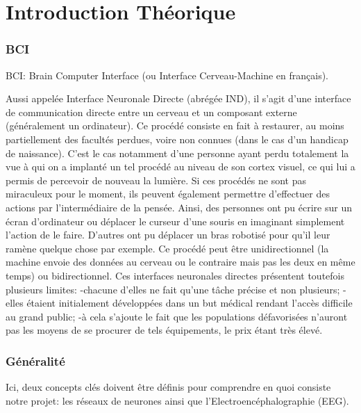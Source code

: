 \part{Introduction Théorique} %
\label{prt:introduction_ _théorique_}
	
	\section{BCI} %
	\label{sec:bci}
	
	BCI: Brain Computer Interface (ou Interface Cerveau-Machine en français).
	
	Aussi appelée Interface Neuronale Directe (abrégée IND), il s'agit d'une interface de communication directe entre un cerveau et un composant externe (généralement un ordinateur).
	Ce procédé consiste en fait à restaurer, au moins partiellement des facultés perdues, voire non connues (dans le cas d'un handicap de naissance). C'est le cas notamment d'une personne ayant perdu totalement la vue à qui on a implanté un tel procédé au niveau de son cortex visuel, ce qui lui a permis de percevoir de nouveau la lumière. Si ces procédés ne sont pas miraculeux pour le moment, ils peuvent également permettre d'effectuer des actions par l'intermédiaire de la pensée. Ainsi, des personnes ont pu écrire sur un écran d'ordinateur ou déplacer le curseur d'une souris en imaginant simplement l'action de le faire. D'autres ont pu déplacer un bras robotisé pour qu'il leur ramène quelque chose par exemple.
	Ce procédé peut être unidirectionnel (la machine envoie des données au cerveau ou le contraire mais pas les deux en même temps) ou bidirectionnel.
	Ces interfaces neuronales directes présentent toutefois plusieurs limites:
-chacune d'elles ne fait qu'une tâche précise et non plusieurs;
-elles étaient initialement développées dans un but médical rendant l'accès difficile au grand public;
-à cela s'ajoute le fait que les populations défavorisées n'auront pas les moyens de se procurer de tels équipements, le prix étant très élevé.
	
	
	

	\section{Généralité} %
	\label{sec:généralité}
	
	Ici, deux concepts clés doivent être définis pour comprendre en quoi consiste notre projet: les réseaux de neurones ainsi que l'Electroencéphalographie (EEG). 
	
